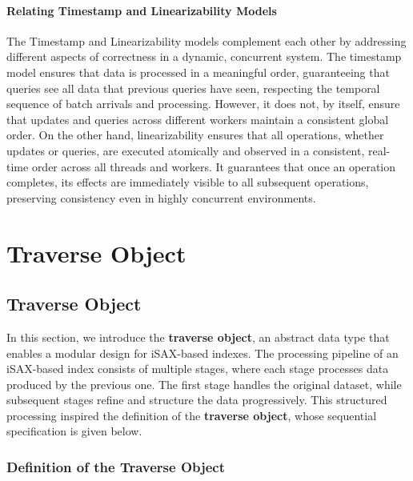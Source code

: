 \documentclass[a4paper,11pt,twoside,openany]{book}
\begin{document}
\subsubsection{Relating Timestamp and Linearizability Models}

The Timestamp and Linearizability models complement each other by addressing different aspects
of correctness in a dynamic, concurrent system. The timestamp model ensures that data is processed
in a meaningful order, guaranteeing that queries see all data that previous queries have seen,
respecting the temporal sequence of batch arrivals and processing. However, it does not, by itself,
ensure that updates and queries across different workers maintain a consistent global order.
% 
On the other hand, linearizability ensures that all operations, whether updates or queries, are
executed atomically and observed in a consistent, real-time order across all threads and workers.
It guarantees that once an operation completes, its effects are immediately visible to all subsequent
operations, preserving consistency even in highly concurrent environments.


\chapter{Traverse Object}
\label{chapter:traverse-object}

\section{Traverse Object}

In this section, we introduce the \textbf{traverse object}, an abstract data type
that enables a modular design for iSAX-based indexes. The processing pipeline of
an iSAX-based index consists of multiple stages, where each stage processes data
produced by the previous one. The first stage handles the original dataset, while
subsequent stages refine and structure the data progressively. This structured
processing inspired the definition of the \textbf{traverse object}, whose
sequential specification is given below.

\subsection{Definition of the Traverse Object}
\end{document}

